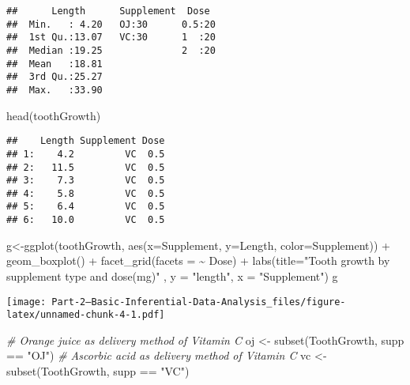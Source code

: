 \documentclass[
]{article}
\newenvironment{Shaded}{\begin{snugshade}}{\end{snugshade}}
\newcommand{\AttributeTok}[1]{\textcolor[rgb]{0.77,0.63,0.00}{#1}}
\newcommand{\CommentTok}[1]{\textcolor[rgb]{0.56,0.35,0.01}{\textit{#1}}}
\newcommand{\FunctionTok}[1]{\textcolor[rgb]{0.00,0.00,0.00}{#1}}
\newcommand{\NormalTok}[1]{#1}
\newcommand{\OtherTok}[1]{\textcolor[rgb]{0.56,0.35,0.01}{#1}}
\newcommand{\SpecialCharTok}[1]{\textcolor[rgb]{0.00,0.00,0.00}{#1}}
\newcommand{\StringTok}[1]{\textcolor[rgb]{0.31,0.60,0.02}{#1}}
\begin{document}
\begin{verbatim}
##      Length      Supplement  Dose   
##  Min.   : 4.20   OJ:30      0.5:20  
##  1st Qu.:13.07   VC:30      1  :20  
##  Median :19.25              2  :20  
##  Mean   :18.81                      
##  3rd Qu.:25.27                      
##  Max.   :33.90
\end{verbatim}

\begin{Shaded}
\begin{Highlighting}[]
\FunctionTok{head}\NormalTok{(toothGrowth)}
\end{Highlighting}
\end{Shaded}

\begin{verbatim}
##    Length Supplement Dose
## 1:    4.2         VC  0.5
## 2:   11.5         VC  0.5
## 3:    7.3         VC  0.5
## 4:    5.8         VC  0.5
## 5:    6.4         VC  0.5
## 6:   10.0         VC  0.5
\end{verbatim}

\begin{Shaded}
\begin{Highlighting}[]
\NormalTok{ g}\OtherTok{\textless{}{-}}\FunctionTok{ggplot}\NormalTok{(toothGrowth, }\FunctionTok{aes}\NormalTok{(}\AttributeTok{x=}\NormalTok{Supplement, }\AttributeTok{y=}\NormalTok{Length, }\AttributeTok{color=}\NormalTok{Supplement)) }\SpecialCharTok{+}
    \FunctionTok{geom\_boxplot}\NormalTok{() }\SpecialCharTok{+} \FunctionTok{facet\_grid}\NormalTok{(}\AttributeTok{facets =} \SpecialCharTok{\textasciitilde{}}\NormalTok{ Dose) }\SpecialCharTok{+} 
   \FunctionTok{labs}\NormalTok{(}\AttributeTok{title=}\StringTok{"Tooth growth by supplement type and dose(mg)"}\NormalTok{ , }
        \AttributeTok{y =} \StringTok{"length"}\NormalTok{, }\AttributeTok{x =} \StringTok{"Supplement"}\NormalTok{)}
\NormalTok{ g}
\end{Highlighting}
\end{Shaded}

\texttt{[image: Part-2--Basic-Inferential-Data-Analysis\_files/figure-latex/unnamed-chunk-4-1.pdf]}

\begin{Shaded}
\begin{Highlighting}[]
\CommentTok{\# Orange juice as delivery method of Vitamin C}
\NormalTok{oj }\OtherTok{\textless{}{-}} \FunctionTok{subset}\NormalTok{(ToothGrowth, supp }\SpecialCharTok{==} \StringTok{"OJ"}\NormalTok{)}
\CommentTok{\# Ascorbic acid as delivery method of Vitamin C}
\NormalTok{vc }\OtherTok{\textless{}{-}} \FunctionTok{subset}\NormalTok{(ToothGrowth, supp }\SpecialCharTok{==} \StringTok{"VC"}\NormalTok{)}
\end{Highlighting}
\end{Shaded}
\end{document}
